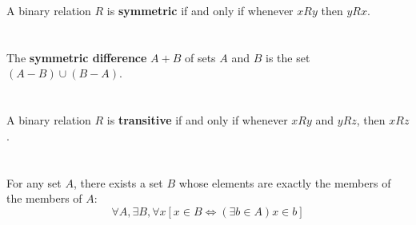 \documentclass{report}
\begin{document}
A binary relation $R$ is \textbf{symmetric} if and only if whenever $xRy$ then
  $yRx$.

\begin{definition}


\end{definition}

\section{}%

The \textbf{symmetric difference} $A + B$ of sets $A$ and $B$ is the set
  $(A - B) \cup (B - A)$.

\begin{definition}


\end{definition}

\section{}%

A binary relation $R$ is \textbf{transitive} if and only if whenever $xRy$ and
  $yRz$, then $xRz$.

\begin{definition}


\end{definition}

\section{}%

For any set $A$, there exists a set $B$ whose elements are exactly the members
  of the members of $A$:
  $$\forall A, \exists B, \forall x
    \left[ x \in B \iff (\exists b \in A) x \in b \right]$$

\begin{axiom}


\end{axiom}
\end{document}
